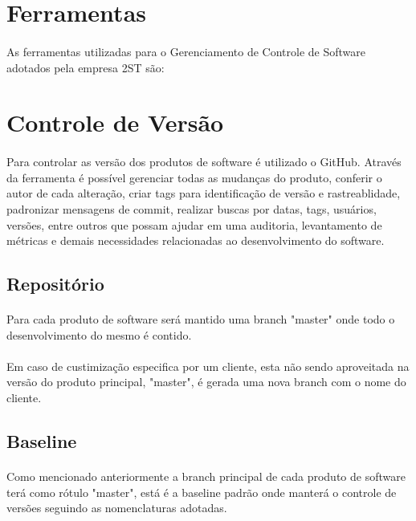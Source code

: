 \documentclass[	DIV=calc,%
							paper=a4,%
							fontsize=12pt,%
							onecolumn]{scrartcl}	 					%
\begin{document}
\newpage
\section{Ferramentas}
\paragraph{}
As ferramentas utilizadas para o Gerenciamento de Controle de Software adotados pela empresa 2ST são:



\section{Controle de Versão}
\paragraph{}
Para controlar as versão dos produtos de software é utilizado o GitHub. Através da ferramenta é possível gerenciar todas as mudanças do produto, conferir o autor de cada alteração, criar tags para identificação de versão e rastreablidade, padronizar mensagens de commit, realizar buscas por datas, tags, usuários, versões, entre outros que possam ajudar em uma auditoria, levantamento de métricas e demais necessidades relacionadas ao desenvolvimento do software.

\subsection{Repositório}
\paragraph{}
Para cada produto de software será mantido uma branch "master" onde todo o desenvolvimento do mesmo é contido.
\paragraph{}
Em caso de custimização especifica por um cliente, esta não sendo aproveitada na versão do produto principal, "master", é gerada uma nova branch com o nome do cliente.

\subsection{Baseline}
\paragraph{}
Como mencionado anteriormente a branch principal de cada produto de software terá como rótulo "master", está é a baseline padrão onde manterá o controle de versões seguindo as nomenclaturas adotadas.
\end{document}
